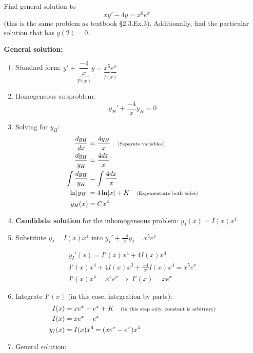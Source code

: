     \begin{example}
        Find general solution to \[xy' - 4y = x^{6}e^{x}\] (this is the same problem as textbook \S 2.3.Ex.3). Additionally, find the particular solution that has \(y(2) = 0\).

        \textbf{General solution:}

        \begin{enumerate}
          \item Standard form:
          \(
            y' +\underbrace{\dfrac{-4}{x}}_{P(x)} y = \underbrace{x^{5}e^{x}}_{f(x)}
          \)
          
          \item Homogeneous subproblem:
            \begin{equation}
              y_{H}' +\dfrac{-4}{x} y_{H} = 0
            \end{equation}
            
          \item Solving for \(y_{H}\):
            \begin{align*}
              \dfrac{dy_{H}}{dx} &= \dfrac{4 y_{H}}{x} \quad \text{\scriptsize (Separate variables)}\\
              \dfrac{dy_{H}}{y_{H}} &= \frac{4 dx}{x} \\
              \int \dfrac{dy_{H}}{y_{H}} &= \int \frac{4 dx}{x} \\
              \ln \lvert y_{H}\rvert &= 4 \ln\lvert x\rvert + K \quad \text{\scriptsize(Exponentiate both sides)} \\
              y_{H}(x) &= C x^{4}
            \end{align*}
          \item \textbf{Candidate solution} for the inhomogeneous problem:
            \(
              y_{I}(x) = I(x) x^{4}
            \)
          \item Substitute \(y_{I} = I(x) x^{4}\) into \(y_{I}' +\frac{-4}{x} y_{I} = x^{5}e^{x}\)

            \begin{align*}
              y_{I}'(x) = I'(x) x^{4} + 4 I(x) x^{3} \\
              I'(x) x^{4} + 4 I(x) x^{3} +\frac{-4}{x} I(x) x^{4} = x^{5}e^{x} \\
              I'(x) x^{4}  = x^{5}e^{x}\  \Rightarrow \
              I'(x) = x e^{x}
            \end{align*}
          \item Integrate \(I'(x)\) (in this case, integration by parts):
            \begin{align*}
              I(x) &= xe^{x} - e^{x} + K \quad \text{\scriptsize(in this step only, constant is arbitrary)} \\
              I(x) &= xe^{x} - e^{x} \\
                     y_{I}(x) &= I(x) x^{4} = (xe^{x} - e^{x}) x^{4}
            \end{align*}
          \item General solution:
          

\end{enumerate}
\end{example}
